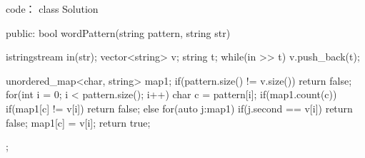 code：
class Solution {
public:
    bool wordPattern(string pattern, string str) {
        istringstream in(str);
        vector<string> v;
        string t;
        while(in >> t) v.push_back(t);

        unordered_map<char, string> map1;
        if(pattern.size() != v.size()) return false;
        for(int i = 0; i < pattern.size(); i++)
        {
            char c = pattern[i];
            if(map1.count(c))
            {
                if(map1[c] != v[i]) return false;
            }
            else
            {
                for(auto j:map1)
                {
                    if(j.second == v[i]) return false;
                }
                map1[c] = v[i];
            }
        }
        return true;
    }
};